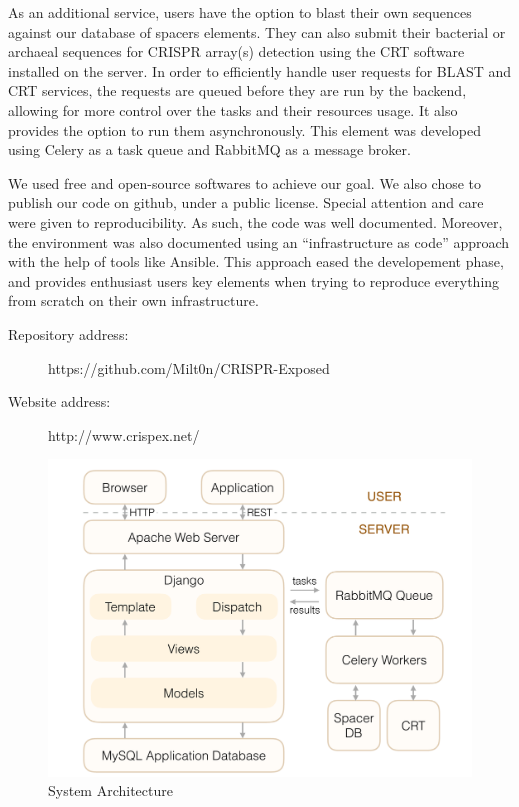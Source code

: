 \documentclass[11pt, a4paper,titlepage]{article}
\begin{document}
As an additional service, users have the option to blast their own
sequences against our database of spacers elements. They can also
submit their bacterial or archaeal sequences for CRISPR array(s)
detection using the CRT software installed on the server. In order to
efficiently handle user requests for BLAST and CRT services, the
requests are queued before they are run by the backend, allowing for
more control over the tasks and their resources usage. It also provides
the option to run them asynchronously. This element was developed
using Celery as a task queue and RabbitMQ as a message broker.

We used free and open-source softwares to achieve our goal. We also
chose to publish our code on github, under a public license. Special
attention and care were given to reproducibility. As such, the code
was well documented. Moreover, the environment was also documented
using an “infrastructure as code” approach with the help of tools like
Ansible. This approach eased the developement phase, and provides
enthusiast users key elements when trying to reproduce everything from
scratch on their own infrastructure.

\begin{description}
  \item[Repository address: ] https://github.com/Milt0n/CRISPR-Exposed
  \item[Website address: ] http://www.crispex.net/
\end{description}

\begin{figure}
  \centering
  \includegraphics[scale=0.3]{figures/soft_arch.pdf}
  \caption{System Architecture}
\end{figure}
\end{document}
